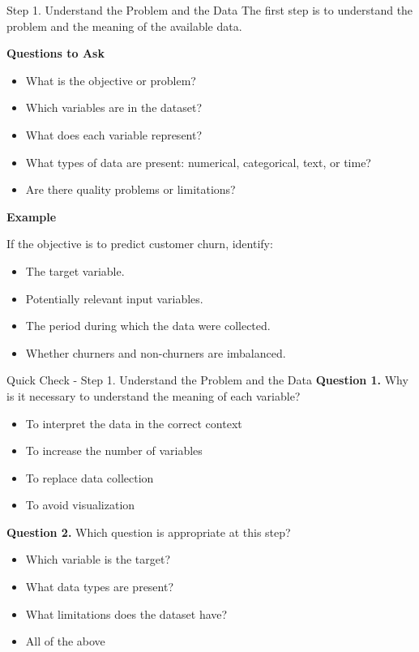 \documentclass[aspectratio=169,11pt]{beamer}
\begin{document}
\begin{frame}[allowframebreaks]{Step 1. Understand the Problem and the Data}
\small
The first step is to understand the problem and the meaning of the available data.\par\medskip
\textbf{Questions to Ask}\par\medskip
\begin{itemize}
\item What is the objective or problem?
\item Which variables are in the dataset?
\item What does each variable represent?
\item What types of data are present: numerical, categorical, text, or time?
\item Are there quality problems or limitations?
\end{itemize}
\textbf{Example}\par\medskip
If the objective is to predict customer churn, identify:\par\medskip
\begin{itemize}
\item The target variable.
\item Potentially relevant input variables.
\item The period during which the data were collected.
\item Whether churners and non-churners are imbalanced.
\end{itemize}
\end{frame}
\begin{frame}[allowframebreaks]{Quick Check - Step 1. Understand the Problem and the Data}
\footnotesize
\textbf{Question 1.} Why is it necessary to understand the meaning of each variable?\par\medskip
\begin{itemize}
\item[\textbf{A.}] To interpret the data in the correct context
\item[\textbf{B.}] To increase the number of variables
\item[\textbf{C.}] To replace data collection
\item[\textbf{D.}] To avoid visualization
\end{itemize}
\textbf{Question 2.} Which question is appropriate at this step?\par\medskip
\begin{itemize}
\item[\textbf{A.}] Which variable is the target?
\item[\textbf{B.}] What data types are present?
\item[\textbf{C.}] What limitations does the dataset have?
\item[\textbf{D.}] All of the above
\end{itemize}
\end{frame}
\end{document}
